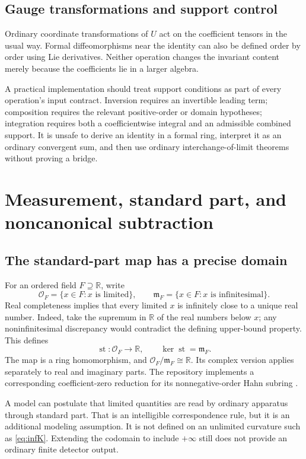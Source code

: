 \documentclass[11pt,letterpaper]{article}
\newcommand{\R}{\mathbb{R}}
\newcommand{\st}{\operatorname{st}}
\theoremstyle{definition}
\theoremstyle{remark}
\begin{document}
\subsection{Gauge transformations and support control}

Ordinary coordinate transformations of $U$ act on the coefficient tensors in
the usual way. Formal diffeomorphisms near the identity can also be defined
order by order using Lie derivatives. Neither operation changes the invariant
content merely because the coefficients lie in a larger algebra.

A practical implementation should treat support conditions as part of every
operation's input contract. Inversion requires an invertible leading term;
composition requires the relevant positive-order or domain hypotheses;
integration requires both a coefficientwise integral and an admissible combined
support. It is unsafe to derive an identity in a formal ring, interpret it as
an ordinary convergent sum, and then use ordinary interchange-of-limit theorems
without proving a bridge.

\section{Measurement, standard part, and noncanonical subtraction}
\label{sec:measurement}

\subsection{The standard-part map has a precise domain}

For an ordered field $F\supseteq\R$, write
\[
 \mathcal O_F=\{x\in F:x\text{ is limited}\},\qquad
 \mathfrak m_F=\{x\in F:x\text{ is infinitesimal}\}.
\]
Real completeness implies that every limited $x$ is infinitely close to a
unique real number. Indeed, take the supremum in $\R$ of the real numbers
below $x$; any noninfinitesimal discrepancy would contradict the defining
upper-bound property. This defines
\[
 \st:\mathcal O_F\longrightarrow\R,
 \qquad \ker\st=\mathfrak m_F.
\]
The map is a ring homomorphism, and
$\mathcal O_F/\mathfrak m_F\cong\R$. Its complex version applies separately to
real and imaginary parts. The repository implements a corresponding
coefficient-zero reduction for its nonnegative-order Hahn subring
\cite{RepoRoot}.

A model can postulate that limited quantities are read by ordinary apparatus
through standard part. That is an intelligible correspondence rule, but it is
an additional modeling assumption. It is not defined on an unlimited
curvature such as \eqref{eq:infK}. Extending the codomain to include
$+\infty$ still does not provide an ordinary finite detector output.
\end{document}
